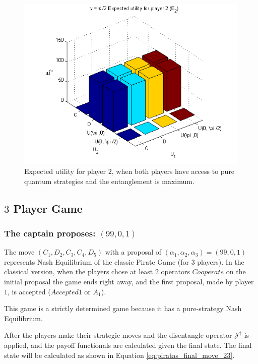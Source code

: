 \begin{figure}[h!]
\centering 
\includegraphics[scale=0.60]{Figures/1.5qubit/P2_E2.png}
\caption{Expected utility for player $2$, when both players have access to pure quantum strategies and the entanglement is maximum. }
\label{fig:pg_2players_99_0_1:2}
\end{figure}


\subsection{$3$ Player Game}
\label{subsec:3playergame}


\subsubsection{The captain proposes: $(99, 0, 1)$}
\label{subsubsec:3playergame99}

The move $(C_1,D_2,C_3,C_4,D_5)$ with a proposal of $(\alpha_{1}, \alpha_{2}, \alpha_{3}) =(99, 0, 1)$ represents Nash Equilibrium of the classic Pirate Game (for $3$ players). In the classical version, when the players chose at least $2$ operators $Cooperate$ on the initial proposal the game ends right away, and the first proposal, made by player $1$, is accepted ($Accepted 1$ or $A_{1}$). 

This game is a strictly determined game because it has a pure-strategy Nash Equilibrium.

After the players make their strategic moves and the disentangle operator $\mathcal{J}^{\dagger}$ is applied, and the payoff functionals are calculated given the final state. The final state will be calculated as shown in Equation \ref{eq:piratas_final_move_23}.

